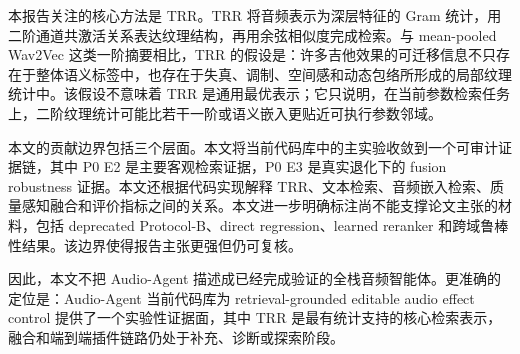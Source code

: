 本报告关注的核心方法是 TRR。TRR 将音频表示为深层特征的 Gram 统计，用二阶通道共激活关系表达纹理结构，再用余弦相似度完成检索。与 mean-pooled Wav2Vec 这类一阶摘要相比，TRR 的假设是：许多吉他效果的可迁移信息不只存在于整体语义标签中，也存在于失真、调制、空间感和动态包络所形成的局部纹理统计中。该假设不意味着 TRR 是通用最优表示；它只说明，在当前参数检索任务上，二阶纹理统计可能比若干一阶或语义嵌入更贴近可执行参数邻域。

本文的贡献边界包括三个层面。本文将当前代码库中的主实验收敛到一个可审计证据链，其中 P0 E2 是主要客观检索证据，P0 E3 是真实退化下的 fusion robustness 证据。本文还根据代码实现解释 TRR、文本检索、音频嵌入检索、质量感知融合和评价指标之间的关系。本文进一步明确标注尚不能支撑论文主张的材料，包括 deprecated Protocol-B、direct regression、learned reranker 和跨域鲁棒性结果。该边界使得报告主张更强但仍可复核。

因此，本文不把 Audio-Agent 描述成已经完成验证的全栈音频智能体。更准确的定位是：Audio-Agent 当前代码库为 retrieval-grounded editable audio effect control 提供了一个实验性证据面，其中 TRR 是最有统计支持的核心检索表示，融合和端到端插件链路仍处于补充、诊断或探索阶段。
